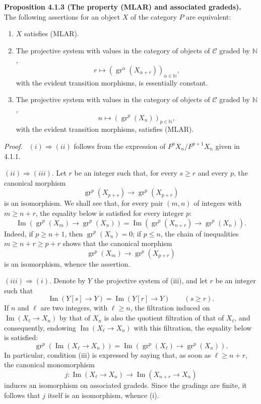 \documentclass[11pt]{article}
\providecommand{\NN}{\mathbb{N}}
\newenvironment{statement}[1]{\par\medskip\noindent\textbf{#1.}\ }{\par\medskip}
\newenvironment{prooftext}[1][Proof]{\par\noindent\emph{#1.}\ }{\par\medskip}
\providecommand{\gr}{\operatorname{gr}}
\providecommand{\NN}{\mathbb N}
\providecommand{\cC}{\mathcal C}
\providecommand{\Im}{\operatorname{Im}}
\providecommand{\gr}{\operatorname{gr}}
\renewcommand{\Im}{\operatorname{Im}}
\providecommand{\gr}{\operatorname{gr}}
\providecommand{\Im}{\operatorname{Im}}
\begin{document}
\begin{statement}{Proposition 4.1.3 (The property (MLAR) and associated gradeds)}
The following assertions for an object $X$ of the category $P$ are equivalent:
\begin{enumerate}[label=(\roman*)]
\item $X$ satisfies (MLAR).
\item The projective system with values in the category of objects of $\cC$ graded by $\NN$,
\[
r\longmapsto (\gr^\alpha(X_{\alpha+r}))_{\alpha\in\NN},
\]
with the evident transition morphisms, is essentially constant.
\item The projective system with values in the category of objects of $\cC$ graded by $\NN$,
\[
n\longmapsto (\gr^p(X_n))_{p\in\NN},
\]
with the evident transition morphisms, satisfies (MLAR).
\end{enumerate}
\end{statement}

\begin{prooftext}[Proof]
$(i)\Rightarrow(ii)$ follows from the expression of $F^pX_n/F^{p+1}X_n$ given in 4.1.1.

$(ii)\Rightarrow(iii)$. Let $r$ be an integer such that, for every $s\ge r$ and every $p$, the canonical morphism
\[
\gr^p(X_{p+s})\longrightarrow \gr^p(X_{p+r})
\]
is an isomorphism. We shall see that, for every pair $(m,n)$ of integers with $m\ge n+r$, the equality below is satisfied for every integer $p$:
\[
\Im(\gr^p(X_m)\to\gr^p(X_n))=
\Im(\gr^p(X_{n+r})\to\gr^p(X_n)).
\]
Indeed, if $p\ge n+1$, then $\gr^p(X_n)=0$; if $p\le n$, the chain of inequalities $m\ge n+r\ge p+r$ shows that the canonical morphism
\[
\gr^p(X_m)\longrightarrow\gr^p(X_{p+r})
\]
is an isomorphism, whence the assertion.

$(iii)\Rightarrow(i)$. Denote by $Y$ the projective system of (iii), and let $r$ be an integer such that
\[
\Im(Y[s]\to Y)=\Im(Y[r]\to Y)\qquad(s\ge r).
\]
If $n$ and $\ell$ are two integers, with $\ell\ge n$, the filtration induced on $\Im(X_\ell\to X_n)$ by that of $X_n$ is also the quotient filtration of that of $X_\ell$, and consequently, endowing $\Im(X_\ell\to X_n)$ with this filtration, the equality below is satisfied:
\[
\gr^p(\Im(X_\ell\to X_n))=
\Im(\gr^p(X_\ell)\to\gr^p(X_n)).
\]
In particular, condition (iii) is expressed by saying that, as soon as $\ell\ge n+r$, the canonical monomorphism
\[
j:\Im(X_\ell\to X_n)\longrightarrow\Im(X_{n+r}\to X_n)
\]
induces an isomorphism on associated gradeds. Since the gradings are finite, it follows that $j$ itself is an isomorphism, whence (i).
\end{prooftext}
\end{document}
